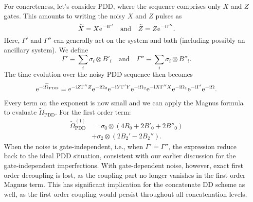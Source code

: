 \documentclass[b5paper,11pt]{article}
\begin{document}
For concreteness, let's consider PDD, where the sequence comprises only $X$ and $Z$ gates. This amounts to writing the noisy $X$ and $Z$ pulses as
\begin{equation}\label{eq:gatedep-noise}
\widetilde{X} = X \mathrm{e}^{-\mathrm{i} \Gamma'}\quad\textrm{and}\quad \widetilde{Z} = Z \mathrm{e}^{-\mathrm{i} \Gamma''}.
\end{equation}
Here, $\Gamma'$ and $\Gamma''$ can generally act on the system and bath (including possibly an ancillary system). 
We define
\begin{equation}
\Gamma' \equiv \sum_i \sigma_i \otimes B'_i \quad \text{and} \quad
\Gamma'' \equiv \sum_i \sigma_i \otimes B''_i.
\end{equation}
The time evolution over the noisy PDD sequence then becomes
\begin{align}
\mathrm{e}^{-\mathrm{i} \widetilde\Omega_\mathrm{PDD} } =
 \mathrm{e}^{-\mathrm{i} Z \Gamma'' Z} \mathrm{e}^{-\mathrm{i} \Omega_3}
 \mathrm{e}^{-\mathrm{i} Y \Gamma' Y} \mathrm{e}^{-\mathrm{i} \Omega_2}
  \mathrm{e}^{-\mathrm{i} X \Gamma'' X} \mathrm{e}^{-\mathrm{i} \Omega_1}
    \mathrm{e}^{-\mathrm{i} \Gamma'} \mathrm{e}^{-\mathrm{i} \Omega}.
\end{align}
Every term on the exponent is now small and we can apply the Magnus formula to evaluate $\widetilde\Omega_\mathrm{PDD}$.
For the first order term: 
\begin{equation}\label{eq:PDD-gatedep-Mag1}
\begin{aligned}
 \widetilde{\Omega}_\mathrm{PDD}^{(1)} 
&= \sigma_0 \otimes (4B_0 + 2 B'_0 + 2B''_0) \\
&+ \sigma_2 \otimes (2B_2'-2B_2'').
\end{aligned}
\end{equation}
When the noise is gate-independent, i.e., when $\Gamma'=\Gamma''$, the expression reduce back to the ideal PDD situation, consistent with our earlier discussion for the gate-independent imperfections. 
With gate-dependent noise, however, exact first order decoupling is lost, as the coupling part  no longer vanishes in the first order Magnus term. 
This has significant implication for the concatenate DD scheme as well, 
as the first order coupling would persist throughout all concatenation levels. 
\end{document}
